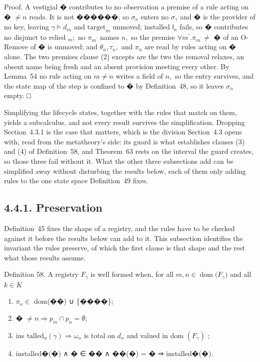 \documentclass[
  10
]{article}
\begin{document}
Proof. A vestigial � contributes to no observation a premise of a rule
acting on � \(\neq n\) reads. It is not ������, so \(\sigma _ { n }\)
enters no \(\sigma _ { \gamma }\) and � is the provider of no key,
leaving \(\gamma \models d _ { m }\) and
\(\mathrm { t a r g e t } _ { m }\) unmoved; installed
\(\mathsf { l } _ { n }\) fails, so � contributes no disjunct to relied
\(_ { m } ;\) no \(\pi _ { m ^ { \prime } }\) names \(n ,\) so the
premise \(\forall m ^ { \prime } . \pi _ { m ^ { \prime } } \neq\) � of
an O-Remove of � is unmoved; and \(\theta _ { n } , \tau _ { n } ,\) and
\(\pi _ { n }\) are read by rules acting on � alone. The two premises
clause (2) excepts are the two the removal relaxes, an absent name being
fresh and an absent provision meeting every other. By Lemma~54 no rule
acting on \(m \neq n\) writes a field of \(n ,\) so the entry survives,
and the state map of the step is confined to � by Definition~48, so it
leaves \(\sigma _ { n }\) empty. □

Simplifying the lifecycle states, together with the rules that match on
them, yields a subcalculus, and not every result survives the
simplification. Dropping Section~4.3.1 is the case that matters, which
is the division Section~4.3 opens with, read from the metatheory's side:
its guard is what establishes clauses (3) and (4) of Definition~58, and
Theorem~63 rests on the interval the guard creates, so those three fail
without it. What the other three subsections add can be simplified away
without disturbing the results below, each of them only adding rules to
the one state space Definition~49 fixes.

\subsection{4.4.1. Preservation}\label{preservation}

Definition~45 fixes the shape of a registry, and the rules have to be
checked against it before the results below can add to it. This
subsection identifies the invariant the rules preserve, of which the
first clause is that shape and the rest what those results assume.

Definition 58. A registry \(F _ { \gamma }\) is well formed when, for
all
\(m , n \in \mathop { \mathrm { d o m } } \bigl ( F _ { \gamma } \bigr )\)
and all \(k \in K\)

\begin{enumerate}
\def\labelenumi{\arabic{enumi}.}
\item
  \(\pi _ { n } \in\) dom(��) ∪ \{����\};
\item
  � \(\neq n \Rightarrow p _ { m } \cap p _ { n } = \emptyset ;\)
\item
  ins
  \(\mathrm { t a l l e d } _ { n } ( \gamma ) \Rightarrow \omega _ { n }\)
  is total on \(d _ { n }\) and valued in dom
  \(\left( F _ { \gamma } \right)\) ;
\item
  installed�(�) ∧ � ∈ �� ∧ ��(�) = � ⇒ installed�(�).
\end{enumerate}
\end{document}
